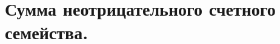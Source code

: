 \documentclass[../main.tex]{subfiles}
\begin{document}
\newpage
\section{Сумма неотрицательного счетного семейства.}
\end{document}
